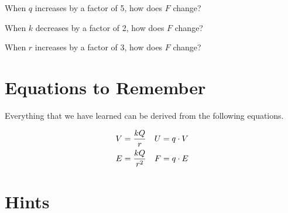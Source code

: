 \documentclass[12pt,paper=letter]{scrartcl}
\begin{document}
    \begin{mdframed}[style=exmdbox, frametitle={Exercises from Mr. Shieh}]
        \begin{problem}[Shieh]
            When $q$ increases by a factor of 5, how does $F$ change?
        \end{problem}
        \begin{problem}[Shieh]
            When $k$ decreases by a factor of 2, how does $F$ change?
            \hints{\ref{hint:k_changes}, \ref{hint:decrease_by_a_factor}}
        \end{problem}
        \begin{problem}[Shieh]
            When $r$ increases by a factor of 3, how does $F$ change?
        \end{problem}
    \end{mdframed}

    \pagebreak[3]


    \section{Equations to Remember}\label{sec:equations-to-remember}

    Everything that we have learned can be derived from the following equations.

    \par

    {\Large
        \begin{align*}
            \setlength{\abovedisplayskip}{3em}
            \setlength{\belowdisplayskip}{\abovedisplayskip}
            V&=\frac{kQ}{r} & U=q\cdot V\\
            E&=\frac{kQ}{r^2} & F=q\cdot E
        \end{align*}}%




    \pagebreak[4]


    \section{Hints} \label{sec:hints}
\end{document}
